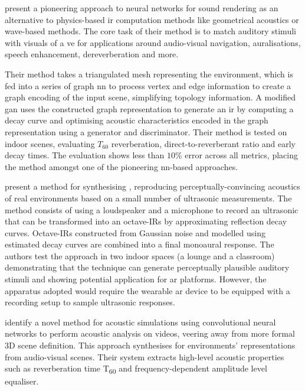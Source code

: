 \cite{ratnarajah2022mesh2ir} present a pioneering approach to neural networks for sound rendering as an alternative to physics-based \acrshort{ir} computation methods like geometrical acoustics or wave-based methods. The core task of their method is to match auditory stimuli with visuals of a \acrshort{ve} for applications around audio-visual navigation, auralisations, speech enhancement, dereverberation and more.\par
Their method takes a triangulated mesh representing the environment, which is fed into a series of graph \acrshort{nn} to process vertex and edge information to create a graph encoding of the input scene, simplifying topology information. A modified \acrfull{gan} uses the constructed graph representation to generate an \acrshort{ir} by computing a decay curve and optimising acoustic characteristics encoded in the graph representation using a generator and discriminator. Their method is tested on indoor scenes, evaluating $T_{60}$ reverberation, direct-to-reverberant ratio and early decay times. The evaluation shows less than $10\%$ error across all metrics, placing the method amongst one of the pioneering \acrshort{nn}-based approaches.\par

\cite{yang2020fast} present a method for synthesising , reproducing perceptually-convincing acoustics of real environments based on a small number of ultrasonic measurements. The method consists of using a loudspeaker and a microphone to record an ultrasonic  that can be transformed into an octave-IRs by approximating reflection decay curves. Octave-IRs constructed from Gaussian noise and modelled using estimated decay curves are combined into a final monoaural response. The authors test the approach in two indoor spaces (a lounge and a classroom) demonstrating that the technique can generate perceptually plausible auditory stimuli and showing potential application for \acrshort{ar} platforms. However, the apparatus adopted would require the wearable \acrshort{ar} device to be equipped with a recording setup to sample ultrasonic responses.\par

\cite{li2018scene} identify a novel method for acoustic simulations using convolutional neural networks to perform acoustic analysis on videos, veering away from more formal 3D scene definition. This approach synthesises  for environments' representations from audio-visual scenes. Their system extracts high-level acoustic properties such as reverberation time T\textsubscript{60} and frequency-dependent amplitude level equaliser.\par

